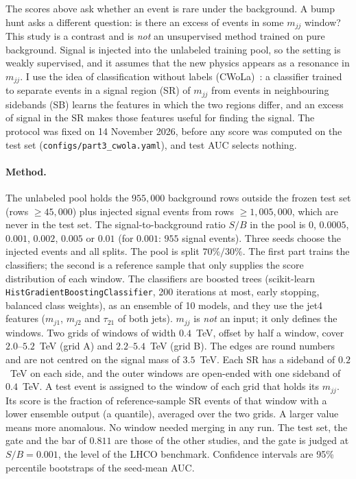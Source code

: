 \documentclass[11pt,a4paper]{article}
\newcommand{\mjj}{\ensuremath{m_{jj}}\xspace}
\begin{document}
The scores above ask whether an event is rare under the background. A bump hunt asks a different
question: is there an excess of events in some \mjj window? This study is a contrast and is
\emph{not} an unsupervised method trained on pure background. Signal is injected into the unlabeled
training pool, so the setting is weakly supervised, and it assumes that the new physics appears as a
resonance in \mjj. I use the idea of classification without labels (CWoLa)~\cite{Metodiev:2017vrx,Collins:2018epr}:
a classifier trained to separate events in a signal region (SR) of \mjj from events in neighbouring
sidebands (SB) learns the features in which the two regions differ, and an excess of signal in the SR
makes those features useful for finding the signal. The protocol was fixed on 14 November 2026, before any score
was computed on the test set (\texttt{configs/part3\_cwola.yaml}), and test AUC selects nothing.

\paragraph{Method.}
The unlabeled pool holds the $955{,}000$ background rows outside the frozen test set (rows $\geq45{,}000$)
plus injected signal events from rows $\geq1{,}005{,}000$, which are never in the test set. The
signal-to-background ratio $S/B$ in the pool is $0$, $0.0005$, $0.001$, $0.002$, $0.005$ or $0.01$
(for $0.001$: $955$ signal events). Three seeds choose the injected events and all splits.
The pool is split $70\%/30\%$. The first part trains the classifiers; the second is a reference sample
that only supplies the score distribution of each window. The classifiers are boosted trees
(scikit-learn \texttt{HistGradientBoostingClassifier}, 200 iterations at most, early stopping,
balanced class weights), as an ensemble of 10 models, and they use the jet4 features ($m_{j1}$, $m_{j2}$ and
$\tau_{21}$ of both jets). \mjj is \emph{not} an input; it only defines the windows.
Two grids of windows of width $0.4$~TeV, offset by half a window, cover $2.0$--$5.2$~TeV (grid A) and
$2.2$--$5.4$~TeV (grid B). The edges are round numbers and are not centred on the signal mass of $3.5$~TeV.
Each SR has a sideband of $0.2$~TeV on each side, and the outer windows are open-ended with one sideband of
$0.4$~TeV. A test event is assigned to the window of each grid that holds its \mjj. Its score is the fraction of
reference-sample SR events of that window with a lower ensemble output (a quantile), averaged over the two
grids. A larger value means more anomalous. No window needed merging in any run.
The test set, the gate and the bar of $0.811$ are those of the other studies, and the gate is judged at
$S/B=0.001$, the level of the LHCO benchmark. Confidence intervals are 95\% percentile bootstraps
of the seed-mean AUC.
\end{document}
